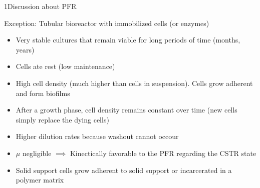 \documentclass[\mainfilename]{subfiles}
\begin{document}
\begin{sectionBox}1{Discussion about PFR} %
    
    Exception: Tubular bioreactor with immobilized cells (or enzymes)
    \begin{itemize}
        \item Very stable cultures that remain viable for long periods of time (months, years)
        \item Cells ate rest (low maintenance)
        \item High cell density (much higher than cells in suspension). Cells grow adherent and form biofilms
        \item After a growth phase, cell density remains constant over time (new cells simply replace the dying cells)
        \item Higher dilution rates because washout cannot occour
        \item \(\mu\) negligible \(\implies\) Kinectically favorable to the PFR regarding the CSTR state
        \item Solid support cells grow adherent to solid support or incarcerated in a polymer matrix
    \end{itemize}
    
\end{sectionBox}
\end{document}
